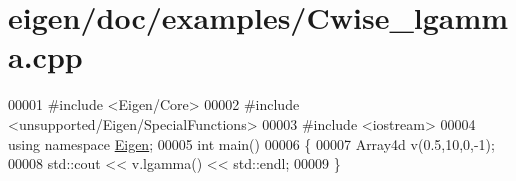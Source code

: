 \hypertarget{eigen_2doc_2examples_2_cwise__lgamma_8cpp_source}{}\section{eigen/doc/examples/\+Cwise\+\_\+lgamma.cpp}
\label{eigen_2doc_2examples_2_cwise__lgamma_8cpp_source}

\begin{DoxyCode}
00001 \textcolor{preprocessor}{#include <Eigen/Core>}
00002 \textcolor{preprocessor}{#include <unsupported/Eigen/SpecialFunctions>}
00003 \textcolor{preprocessor}{#include <iostream>}
00004 \textcolor{keyword}{using namespace }\hyperlink{namespace_eigen}{Eigen};
00005 \textcolor{keywordtype}{int} main()
00006 \{
00007   Array4d v(0.5,10,0,-1);
00008   std::cout << v.lgamma() << std::endl;
00009 \}
\end{DoxyCode}
